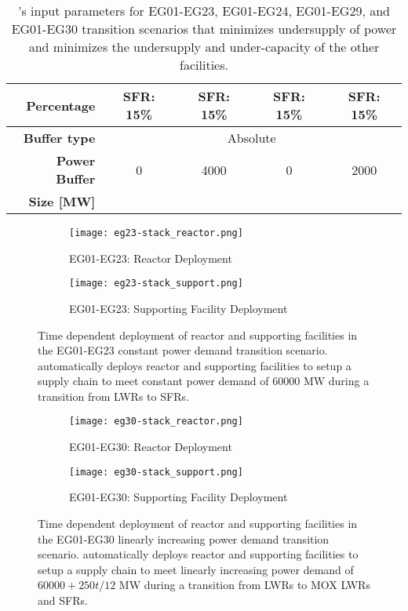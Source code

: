\begin{table}[]
{\begin{tabular}{r|cccc}
	\textbf{Percentage} &SFR: 15\%&SFR: 15\%&SFR: 15\%&SFR: 15\%\\ \hline
	\textbf{Buffer type}                                                    & \multicolumn{4}{c}{Absolute}                                                                                                                                                                                                                                                               \\ \hline
	\textbf{Power Buffer}                                                  & 0 & 4000 & 0 & 2000 \\ 
	\textbf{Size [MW]} \\ \hline \end{tabular}}
	\caption{\deploy's input parameters for EG01-EG23, EG01-EG24, EG01-EG29, and 
	EG01-EG30 transition scenarios
	that minimizes undersupply of power and minimizes 
	the undersupply and under-capacity of the other facilities. }
	\label{tab:bestinputs}
	\end{table}

\begin{figure}[]
	\centering
	\begin{subfigure}[t]{1\textwidth}
		\centering
		\texttt{[image: eg23-stack\_reactor.png]} 
		\caption{EG01-EG23: Reactor Deployment}
		\label{fig:23reactor}
	\end{subfigure}
	\begin{subfigure}[t]{1\textwidth}
		\centering
		\texttt{[image: eg23-stack\_support.png]} 
		\caption{EG01-EG23: Supporting Facility Deployment}
		\label{fig:23support}
	\end{subfigure}
	\hfill
	\caption{Time dependent deployment of reactor and supporting facilities in 
	the EG01-EG23 constant power demand transition scenario. 
	\deploy automatically deploys reactor and supporting facilities 
	to setup a supply chain to meet constant power demand of $60000$ MW
	during a transition from \glspl{LWR} to \glspl{SFR}. }
	\label{fig:23stack}
\end{figure}

\begin{figure}[]
	\centering
	\begin{subfigure}[t]{1\textwidth}
		\centering
		\texttt{[image: eg30-stack\_reactor.png]} 
		\caption{EG01-EG30: Reactor Deployment}
		\label{fig:30reactor}
	\end{subfigure}
	\begin{subfigure}[t]{1\textwidth}
		\centering
		\texttt{[image: eg30-stack\_support.png]} 
		\caption{EG01-EG30: Supporting Facility Deployment}
		\label{fig:30support}
	\end{subfigure}
	\hfill
	\caption{Time dependent deployment of reactor and supporting facilities in 
	the EG01-EG30 linearly increasing power demand transition scenario. 
	\deploy automatically deploys reactor and supporting facilities 
	to setup a supply chain to meet linearly increasing power demand of $60000 + 250t/12$ MW
	during a transition from \glspl{LWR} to MOX LWRs and \glspl{SFR}. }
	\label{fig:30stack}
\end{figure}

